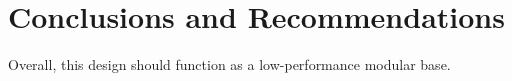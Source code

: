 \section*{Conclusions and Recommendations}
Overall, this design should function as a low-performance modular base. 
